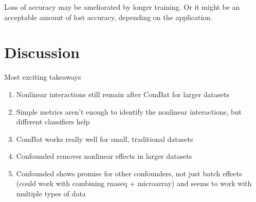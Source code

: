 \documentclass[notitlepage]{article}
\begin{document}
Loss of accuracy may be ameliorated by longer training.
Or it might be an acceptable amount of lost accuracy, depending on the application.

\section{Discussion} \label{sec:discussion}

Most exciting takeaways

\begin{enumerate}
	\item Nonlinear interactions still remain after ComBat for larger datasets
	\item Simple metrics aren't enough to identify the nonlinear interactions, but different classifiers help
	\item ComBat works really well for small, traditional datasets %
	\item Confounded removes nonlinear effects in larger datasets
	\item Confounded shows promise for other confounders, not just batch effects (could work with combining rnaseq + microarray) and seems to work with multiple types of data
\end{enumerate}


\end{document}
